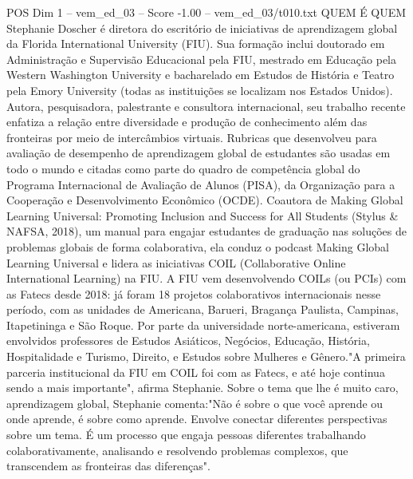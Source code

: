 \begin{textsample}{POS Dim 1 – vem\_ed\_03 – Score -1.00 – vem\_ed\_03/t010.txt}  \label{ex:f1_pos_032}
QUEM É QUEM Stephanie Doscher é diretora do escritório de iniciativas de aprendizagem global da Florida International University (FIU).
Sua formação inclui doutorado em Administração e Supervisão Educacional pela FIU, mestrado em Educação pela Western Washington University e bacharelado em Estudos de História e Teatro pela Emory University (todas as instituições se localizam nos Estados Unidos).
Autora, pesquisadora, palestrante e consultora internacional, seu trabalho recente enfatiza a relação entre diversidade e produção de conhecimento além das fronteiras por meio de intercâmbios virtuais.
Rubricas que desenvolveu para avaliação de desempenho de aprendizagem global de estudantes são usadas em todo o mundo e citadas como parte do quadro de competência global do Programa Internacional de Avaliação de Alunos (PISA), da Organização para a Cooperação e Desenvolvimento Econômico (OCDE).
Coautora de Making Global Learning Universal: Promoting Inclusion and Success for All Students (Stylus \& NAFSA, 2018), um manual para engajar estudantes de graduação nas soluções de problemas globais de forma colaborativa, ela conduz o podcast Making Global Learning Universal e lidera as iniciativas COIL (Collaborative Online International Learning) na FIU.
A FIU vem desenvolvendo COILs (ou PCIs) com as Fatecs desde 2018: já foram 18 projetos colaborativos internacionais nesse período, com as unidades de Americana, Barueri, Bragança Paulista, Campinas, Itapetininga e São Roque.
Por parte da universidade norte-americana, estiveram envolvidos professores de Estudos Asiáticos, Negócios, Educação, História, Hospitalidade e Turismo, Direito, e Estudos sobre Mulheres e Gênero."A primeira parceria institucional da FIU em COIL foi com as Fatecs, e até hoje continua sendo a mais importante", afirma Stephanie.
Sobre o tema que lhe é muito caro, aprendizagem global, Stephanie comenta:"Não é sobre o que você aprende ou onde aprende, é sobre como aprende.
Envolve conectar diferentes perspectivas sobre um tema.
É um processo que engaja pessoas diferentes trabalhando colaborativamente, analisando e resolvendo problemas complexos, que transcendem as fronteiras das diferenças".

\end{textsample}
